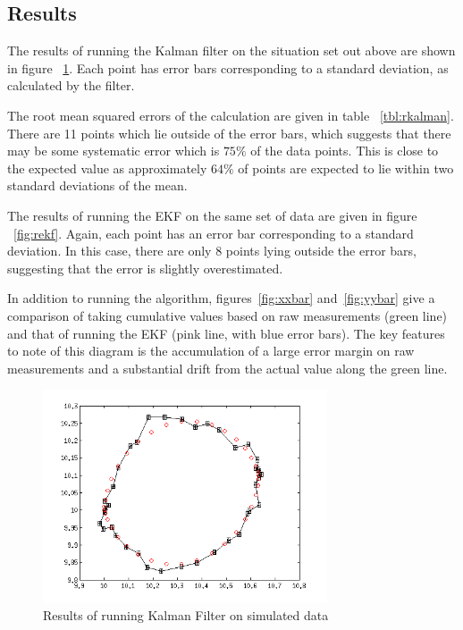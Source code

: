 \documentclass[english]{article}
\begin{document}
\subsection{Results}
The results of running the Kalman filter on the situation set out above are shown in figure ~\ref{fig:rkalman}. Each point has error bars corresponding to a standard deviation, as calculated by the filter.

The root mean squared errors of the calculation are given in table ~\ref{tbl:rkalman}. There are 11 points which lie outside of the error bars, which suggests that there may be some systematic error which is $75\%$ of the data points. This is close to the expected value as approximately $64\%$ of points are expected to lie within two standard deviations of the mean.

The results of running the EKF on the same set of data are given in figure ~\ref{fig:rekf}. Again, each point has an error bar corresponding to a standard deviation. In this case, there are only $8$ points lying outside the error bars, suggesting that the error is slightly overestimated.

In addition to running the algorithm, figures~\ref{fig:xxbar} and~\ref{fig:yybar} give a comparison of taking cumulative values based on raw measurements (green line) and that of running the EKF (pink line, with blue error bars). The key features to note of this diagram is the accumulation of a large error margin on raw measurements and a substantial drift from the actual value along the green line.

\begin{figure}[htp]
\centering
 \includegraphics[width=0.75\textwidth]{images/Kalman.png}
\caption{Results of running Kalman Filter on simulated data}
\label{fig:rkalman}
\end{figure}
\end{document}
